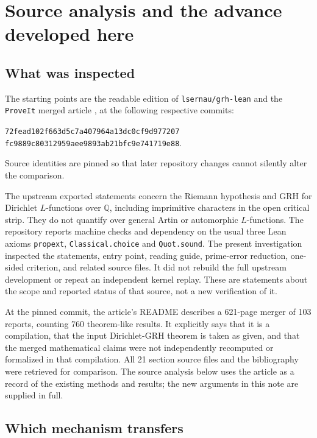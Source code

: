 \section{Source analysis and the advance developed here}
\label{sec:context}

\subsection{What was inspected}

The starting points are the readable edition of \texttt{lsernau/grh-lean}
and the \texttt{ProveIt} merged article \cite{Sernau2026,ProveIt2026},
at the following respective commits:
\begin{center}\small
\texttt{72fead102f663d5c7a407964a13dc0cf9d977207}\\
\texttt{fc9889c80312959aee9893ab21bfc9e741719e88}.
\end{center}
Source identities are pinned so that
later repository changes cannot silently alter the comparison.

The upstream exported statements concern the Riemann hypothesis and
GRH for Dirichlet $L$-functions over $\mathbb Q$, including imprimitive
characters in the open critical strip. They do not quantify over
general Artin or automorphic $L$-functions. The repository reports
machine checks and dependency on the usual three Lean axioms
\texttt{propext}, \texttt{Classical.choice} and \texttt{Quot.sound}.
The present investigation inspected the statements, entry point,
reading guide, prime-error reduction, one-sided criterion, and related
source files. It did not rebuild the full upstream development or
repeat an independent kernel replay. These are statements about the
scope and reported status of that source, not a new verification of it.

At the pinned commit, the article's README describes a 621-page merger
of 103 reports, counting 760 theorem-like results. It explicitly says
that it is a compilation, that the input Dirichlet-GRH theorem is taken
as given, and that the merged mathematical claims were not independently
recomputed or formalized in that compilation. All 21 section source
files and the bibliography were retrieved for comparison. The source
analysis below uses the article as a record of the existing methods and
results; the new arguments in this note are supplied in full.

\subsection{Which mechanism transfers}


